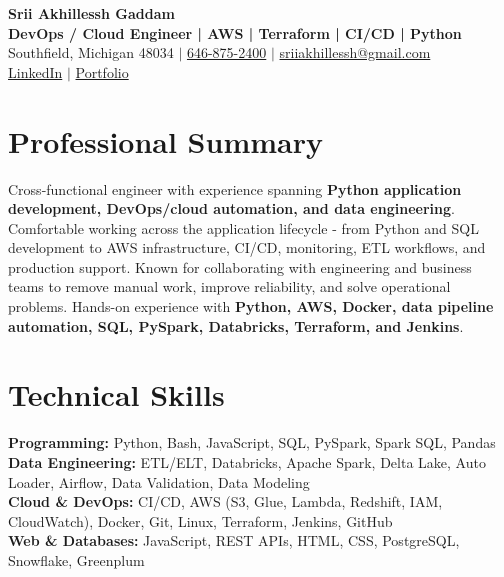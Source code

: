\documentclass[letterpaper,10pt]{article}
\begin{document}
\fontsize{9.35pt}{10.45pt}\selectfont

\begin{center}
    {\LARGE \textbf{Srii Akhillessh Gaddam}} \\[-1pt]
    \textbf{DevOps / Cloud Engineer | AWS | Terraform | CI/CD | Python} \\[2pt]
    Southfield, Michigan 48034 $|$
    \href{tel:6468752400}{646-875-2400} $|$
    \href{mailto:sriiakhillessh@gmail.com}{sriiakhillessh@gmail.com} \\[1pt]
    \href{https://www.linkedin.com/in/srii-akhiilessh-gaddam-b48668191/}{LinkedIn} $|$
    \href{https://sriiakhillesshg.github.io/portfolio/}{Portfolio}
\end{center}
\vspace{-8pt}

\section{Professional Summary}
\small{Cross-functional engineer with experience spanning \textbf{Python application development, DevOps/cloud automation, and data engineering}. Comfortable working across the application lifecycle - from Python and SQL development to AWS infrastructure, CI/CD, monitoring, ETL workflows, and production support. Known for collaborating with engineering and business teams to remove manual work, improve reliability, and solve operational problems. Hands-on experience with \textbf{Python, AWS, Docker, data pipeline automation, SQL, PySpark, Databricks, Terraform, and Jenkins}.}

\section{Technical Skills}
\small{
\textbf{Programming:} Python, Bash, JavaScript, SQL, PySpark, Spark SQL, Pandas \\
\textbf{Data Engineering:} ETL/ELT, Databricks, Apache Spark, Delta Lake, Auto Loader, Airflow, Data Validation, Data Modeling \\
\textbf{Cloud \& DevOps:} CI/CD, AWS (S3, Glue, Lambda, Redshift, IAM, CloudWatch), Docker, Git, Linux, Terraform, Jenkins, GitHub \\
\textbf{Web \& Databases:} JavaScript, REST APIs, HTML, CSS, PostgreSQL, Snowflake, Greenplum
}
\end{document}
